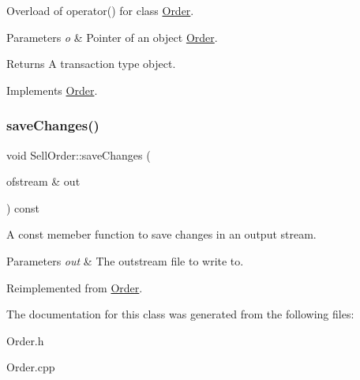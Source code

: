 Overload of operator() for class \hyperlink{class_order}{Order}. 
\begin{DoxyParams}{Parameters}
{\em o} & Pointer of an object \hyperlink{class_order}{Order}. \\
\hline
\end{DoxyParams}
\begin{DoxyReturn}{Returns}
A transaction type object. 
\end{DoxyReturn}


Implements \hyperlink{class_order_a85d5de18c8664085619e3a5c74d47a25}{Order}.

\hypertarget{class_sell_order_a81c6ea39652c38a718803c036767787f}{}\label{class_sell_order_a81c6ea39652c38a718803c036767787f} 
\subsubsection{\texorpdfstring{save\+Changes()}{saveChanges()}}
{\footnotesize\ttfamily void Sell\+Order\+::save\+Changes (\begin{DoxyParamCaption}\item[{ofstream \&}]{out }\end{DoxyParamCaption}) const\hspace{0.3cm}{\ttfamily [virtual]}}

A const memeber function to save changes in an output stream. 
\begin{DoxyParams}{Parameters}
{\em out} & The outstream file to write to. \\
\hline
\end{DoxyParams}


Reimplemented from \hyperlink{class_order_a83989bde0a9b40cbeb0e87c965f6096e}{Order}.



The documentation for this class was generated from the following files\+:\begin{DoxyCompactItemize}
\item 
Order.\+h\item 
Order.\+cpp\end{DoxyCompactItemize}
